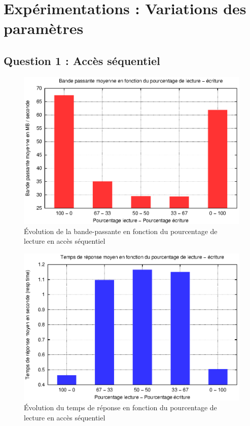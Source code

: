 \documentclass[a4paper]{article}
\begin{document}
\FloatBarrier


\newpage
\section{Expérimentations : Variations des paramètres}

\subsection{Question 1 : Accès séquentiel}

\begin{figure}[h]
	\begin{center}
		\includegraphics[scale=0.70]{Question1/bande_passante_moyenne.eps}
	\end{center}
   	\caption{Évolution de la bande-passante en fonction du pourcentage de lecture en accès séquentiel}
	\label{fig:courbe_bande_passante_lect_seq}
\end{figure}

\FloatBarrier

\begin{figure}[h]
	\begin{center}
		\includegraphics[scale=0.70]{Question1/tps_resp_moyen.eps}
	\end{center}
   	\caption{Évolution du temps de réponse en fonction du pourcentage de lecture en accès séquentiel}
	\label{fig:courbe_tps_rep_lect_seq}
\end{figure}
\FloatBarrier
\end{document}
